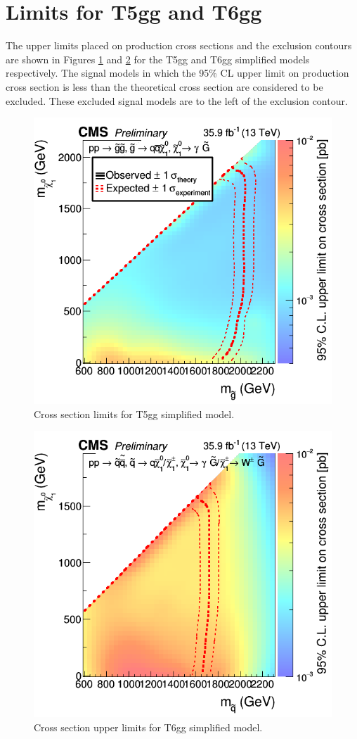\section{Limits for T5gg and T6gg}
The upper limits placed on production cross sections and the exclusion contours are shown in Figures \ref{fig:t5wgjul20xsec} and \ref{fig:t6wgjul20xsec} for the T5gg and T6gg simplified models respectively.  The signal models in which the 95\% CL upper limit on production cross section is less than the theoretical cross section are considered to be excluded.  These excluded signal models are to the left of the exclusion contour.

\begin{figure}[h]
	\centering
	\includegraphics[width=0.9\linewidth]{Figures/T5WgJul20XSEC}
	\caption[Cross section limits for T5gg simplified model.]{Cross section limits for T5gg simplified model.}
	\label{fig:t5wgjul20xsec}
\end{figure}

\begin{figure}[h]
	\centering
	\includegraphics[width=0.9\linewidth]{Figures/T6WgJul20XSEC}
	\caption[Cross section upper limits for T6gg simplified model.]{Cross section upper limits for T6gg simplified model.}
	\label{fig:t6wgjul20xsec}
\end{figure}





